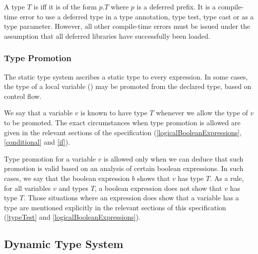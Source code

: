 \documentclass[makeidx]{article}
\begin{document}
{

\LMHash{}%
A type $T$ is 
if{}f it is of the form $p.T$ where $p$ is a deferred prefix.
It is a compile-time error to use a deferred type in a type annotation, type test, type cast or as a type parameter.
However, all other compile-time errors must be issued under the assumption that all deferred libraries have successfully been loaded.



\subsubsection{Type Promotion}

\LMHash{}%
The static type system ascribes a static type to every expression.
In some cases, the type of a local variable ()
may be promoted from the declared type, based on control flow.

\LMHash{}%
We say that a variable $v$ is known to have type $T$ whenever we allow the type of $v$ to be promoted.
The exact circumstances when type promotion is allowed are given in the relevant sections of the specification (\ref{logicalBooleanExpressions}, \ref{conditional} and \ref{if}).

\LMHash{}%
Type promotion for a variable $v$ is allowed only when we can deduce that such promotion is valid based on an analysis of certain boolean expressions.
In such cases, we say that the boolean expression $b$ shows that $v$ has type $T$.
As a rule, for all variables $v$ and types $T$, a boolean expression does not show that $v$ has type $T$.
Those situations where an expression does show that a variable has a type are mentioned explicitly in the relevant sections of this specification (\ref{typeTest} and \ref{logicalBooleanExpressions}).


\subsection{Dynamic Type System}

}
\end{document}
